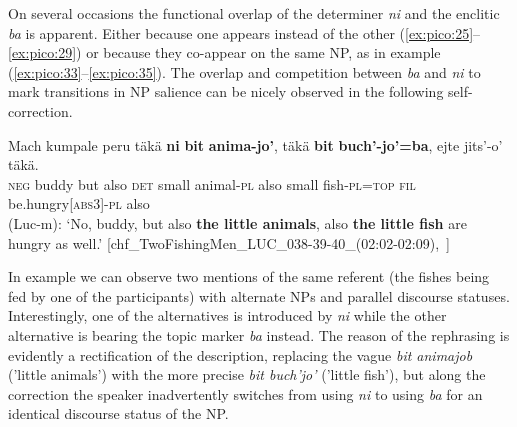 \documentclass[output=paper
,modfonts
,nonflat]{langsci/langscibook}
\begin{document}
\z


On several occasions the functional overlap of the determiner \textit{ni} and the enclitic \textit{ba} is apparent. Either because one appears instead of the other (\ref{ex:pico:25}--\ref{ex:pico:29}) or because they co-appear on the same NP, as in example (\ref{ex:pico:33}--\ref{ex:pico:35}). The overlap and competition between \textit{ba} and \textit{ni} to mark transitions in NP salience can be nicely observed in the following self-correction.


\ea
\label{ex:pico:36}

\gll Mach kumpale peru t\"ak\"a \textbf{ni} \textbf{bit} \textbf{anima-jo'}, t\"ak\"a \textbf{bit} \textbf{buch'-jo'=ba}, ejte jits'-o' t\"ak\"a.\\
{\textsc{neg}} buddy but also {\textsc{det}} small animal-{\textsc{pl}} also small fish-{\textsc{pl}}={\textsc{top}} {\textsc{fil}} be.hungry{\textsc{[abs3]}}-{\textsc{pl}} also\\
\glt (Luc-m): `No, buddy, but also \textbf{the little animals}, also \textbf{the little fish} are hungry as well.' [chf\_TwoFishingMen\_LUC\_038-39-40\_(02:02-02:09),~\citealt{Delgado-Galvan2018archive}]
\z

In example  we can observe two mentions of the same referent (the fishes being fed by one of the participants) with alternate NPs and parallel discourse statuses. Interestingly, one of the alternatives is introduced by \textit{ni} while the other alternative is bearing the topic marker \textit{ba} instead. The reason of the rephrasing is evidently a rectification of the description, replacing the vague \textit{bit animajob} ('little animals') with the more precise \textit{bit buch'jo'} ('little fish'), but along the correction the speaker inadvertently switches from using \textit{ni} to using \textit{ba} for an identical discourse status of the NP.
\end{document}
